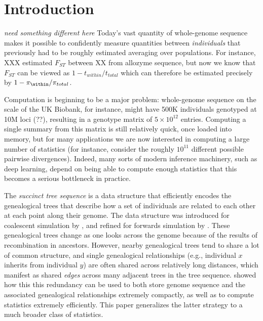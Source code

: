 \documentclass{article}
\newcommand{\plr}[1]{{\color{blue} \it #1}}
\begin{document}
\section*{Introduction}

\plr{need something different here}
Today's vast quantity of whole-genome sequence
makes it possible to confidently measure quantities
between \emph{individuals} that previously had to be roughly estimated
averaging over populations.
For instance, XXX estimated $F_{ST}$ between XX from allozyme sequence,
but now we know that $F_{ST}$ can be viewed as $1 - t_{within}/t_{total}$ \citep{slatkin_fst}
which can therefore be estimated precisely by $1 - \pi_{\within}/\pi_{total}$.

Computation is beginning to be a major problem:
whole-genome sequence on the scale of the UK Biobank,
for instance, might have 500K individuals genotyped at 10M loci (??),
resulting in a genotype matrix of $5 \times 10^{12}$ entries.
Computing a single summary from this matrix is still relatively quick,
once loaded into memory,
but for many applications we are now interested in computing a large number of statistics
(for instance, consider the roughly $10^{11}$ different possible pairwise divergences).
Indeed, many sorts of modern inference machinery, such as deep learning,
depend on being able to compute enough statistics that this becomes a serious bottleneck in practice.

The \emph{succinct tree sequence} is a data structure that efficiently encodes
the genealogical trees that describe how a set of individuals are related to each other
at each point along their genome.
The data structure was introduced for coalescent simulation by \citet{kelleher2016efficient},
and refined for forwards simulation by \citet{kelleher2018efficient}.
These genealogical trees change as one looks across the genome
because of the results of recombination in ancestors.
However, nearby genealogical trees tend to share a lot of common structure,
and single genealogical relationships (e.g., individual $x$ inherits from individual $y$)
are often shared across relatively long distances,
which manifest as shared \emph{edges} across many adjacent trees in the tree sequence.
\citet{kelleher2016efficient}
showed how this this redundancy can be used
to both store genome sequence and the associated genealogical relationships extremely compactly,
as well as to compute statistics extremely efficiently.
This paper generalizes the latter strategy
to a much broader class of statistics.
\end{document}
